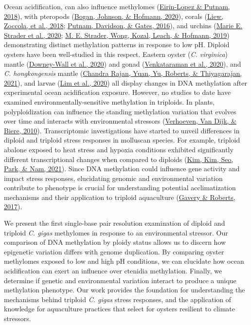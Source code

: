 \documentclass [11pt, proquest] {uwthesis}[2015/03/03]
\begin{document}
Ocean acidification, can also influence methylomes (\protect\hyperlink{ref-Eirin-Lopez2018}{Eirin-Lopez \& Putnam, 2018}), with pteropods (\protect\hyperlink{ref-Bogan2020}{Bogan, Johnson, \& Hofmann, 2020}), corals (\protect\hyperlink{ref-Liew2018b}{Liew, Zoccola, et al., 2018}; \protect\hyperlink{ref-Putnam2016}{Putnam, Davidson, \& Gates, 2016}), and urchins (\protect\hyperlink{ref-Strader2020}{Marie E. Strader et al., 2020}; \protect\hyperlink{ref-Strader2019}{M. E. Strader, Wong, Kozal, Leach, \& Hofmann, 2019}) demonstrating distinct methylation patterns in response to low pH. Diploid oysters have been well-studied in this respect. Eastern oyster (\emph{C. virginica}) mantle (\protect\hyperlink{ref-Downey-Wall2020}{Downey-Wall et al., 2020}) and gonad (\protect\hyperlink{ref-Venkataraman2020}{Venkataraman et al., 2020}), and \emph{C. hongkongensis} mantle (\protect\hyperlink{ref-ChandraRajan2021}{Chandra Rajan, Yuan, Yu, Roberts, \& Thiyagarajan, 2021}), and larvae (\protect\hyperlink{ref-Lim2020}{Lim et al., 2020}) all display changes in DNA methylation after experimental ocean acidification exposure. However, no studies to date have examined environmentally-sensitive methylation in triploids. In plants, polyploidization can influence the standing methylation variation that evolves over time and interacts with environmental stressors (\protect\hyperlink{ref-Verhoeven2010}{Verhoeven, Van Dijk, \& Biere, 2010}). Transcriptomic investigations have started to unveil differences in diploid and triploid stress responses in molluscan species. For example, triploid abalone exposed to heat stress and hypoxia conditions exhibited significantly different transcriptional changes when compared to diploids (\protect\hyperlink{ref-Kim2021}{Kim, Kim, Seo, Park, \& Nam, 2021}). Since DNA methylation could influence gene activity and impact stress responses, elucidating genomic and environmental variation contribute to phenotype is crucial for understanding potential acclimatization mechanisms and their application to triploid aquaculture (\protect\hyperlink{ref-Gavery2017}{Gavery \& Roberts, 2017}).

We present the first single-base pair resolution examination of diploid and triploid \emph{C. gigas} methylomes in response to an environmental stressor. Our comparison of DNA methylation by ploidy status allows us to discern how epigenetic variation differs with genome duplication. By comparing oyster methylomes exposed to low and high pH conditions, we can elucidate how ocean acidification can exert an influence over ctenidia methylation. Finally, we determine if genetic and environmental variation interact to produce a unique methylation phenotype. Our work provides the foundation for understanding the mechanisms behind triploid \emph{C. gigas} stress responses, and the application of knowledge for aquaculture practices that select for oysters resilient to climate stressors.
\end{document}
